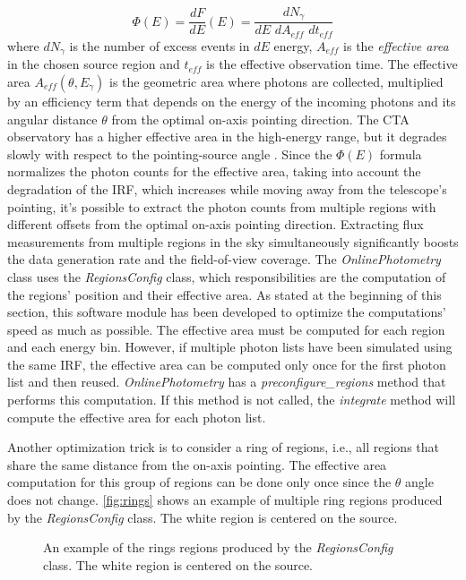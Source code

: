 $$
\Phi(E)=\frac{dF}{dE}(E)=\frac{dN_\gamma}{dE\,\,dA_{eff}\,\,dt_{eff}}
$$
where $dN_\gamma$ is the number of excess events in $dE$ energy, $A_{eff}$ is the \textit{effective area} in the chosen source region and $t_{eff}$ is the effective observation time. The effective area $A_{eff}(\theta,E_\gamma)$ is the geometric area where photons are collected, multiplied by an efficiency term that depends on the energy of the incoming photons and its angular distance $\theta$ from the optimal on-axis pointing direction. The CTA observatory has a higher effective area in the high-energy range, but it degrades slowly with respect to the pointing-source angle \cite{tampieri2020real}. Since the $\Phi(E)$ formula normalizes the photon counts for the effective area, taking into account the degradation of the IRF, which increases while moving away from the telescope's pointing, it's possible to extract the photon counts from multiple regions with different offsets from the optimal on-axis pointing direction. Extracting flux measurements from multiple regions in the sky simultaneously significantly boosts the data generation rate and the field-of-view coverage.
The \textit{OnlinePhotometry} class uses the \textit{RegionsConfig} class, which responsibilities are the computation of the regions' position and their effective area. As stated at the beginning of this section, this software module has been developed to optimize the computations' speed as much as possible. The effective area must be computed for each region and each energy bin. However, if multiple photon lists have been simulated using the same IRF, the effective area can be computed only once for the first photon list and then reused. \textit{OnlinePhotometry} has a \textit{preconfigure\_regions} method that performs this computation. If this method is not called, the \textit{integrate} method will compute the effective area for each photon list.

Another optimization trick is to consider a ring of regions, i.e., all regions that share the same distance from the on-axis pointing. The effective area computation for this group of regions can be done only once since the $\theta$ angle does not change. \autoref{fig:rings} shows an example of multiple ring regions produced by the \textit{RegionsConfig} class. The white region is centered on the source.
\begin{figure}[t]
\centering

\caption{An example of the rings regions produced by the \textit{RegionsConfig} class. The white region is centered on the source.}
\label{fig:rings}
\end{figure}



